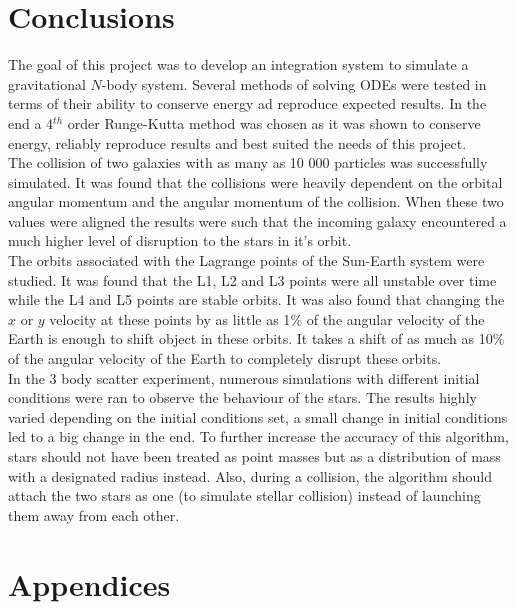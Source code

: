 \documentclass[10pt,letterpaper]{article}
\begin{document}
\pagebreak
\section{Conclusions}

The goal of this project was to develop an integration system to simulate a gravitational $N$-body system. Several methods of solving ODEs were tested in terms of their ability to conserve energy ad reproduce expected results. In the end a 4$^{th}$ order Runge-Kutta method was chosen as it was shown to conserve energy, reliably reproduce results and best suited the needs of this project.\\

The collision of two galaxies with as many as 10 000 particles was successfully simulated. It was found that the collisions were heavily dependent on the orbital angular momentum and the angular momentum of the collision. When these two values were aligned the results were such that the incoming galaxy encountered a much higher level of disruption to the stars in it's orbit.\\

The orbits associated with the Lagrange points of the Sun-Earth system were studied. It was found that the L1, L2 and L3 points were all unstable over time while the L4 and L5 points are stable orbits. It was also found that changing the $x$ or $y$ velocity at these points by as little as 1$\%$ of the angular velocity of the Earth is enough to shift object in these orbits. It takes a shift of as much as 10$\%$ of the angular velocity of the Earth to completely disrupt these orbits.\\

In the 3 body scatter experiment, numerous simulations with different initial conditions were ran to observe the behaviour of the stars. The results highly varied depending on the initial conditions set, a small change in initial conditions led to a big change in the end. To further increase the accuracy of this algorithm, stars should not have been treated as point masses but as a distribution of mass with a designated radius instead. Also, during a collision, the algorithm should attach the two stars as one (to simulate stellar collision) instead of launching them away from each other.\\

\pagebreak
\appendix

\section{Appendices}
\end{document}
